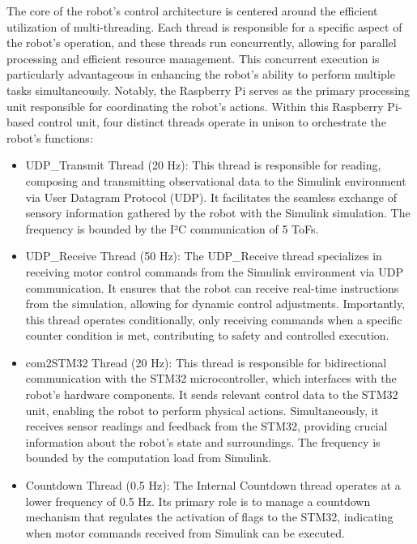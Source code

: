 The core of the robot's control architecture is centered around the efficient utilization of multi-threading. Each thread is responsible for a specific aspect of the robot's operation, and these threads run concurrently, allowing for parallel processing and efficient resource management. This concurrent execution is particularly advantageous in enhancing the robot's ability to perform multiple tasks simultaneously. Notably, the Raspberry Pi serves as the primary processing unit responsible for coordinating the robot's actions. Within this Raspberry Pi-based control unit, four distinct threads operate in unison to orchestrate the robot's functions: 
\begin{itemize}
    \item UDP\_Transmit Thread (20 Hz): This thread is responsible for reading, composing and transmitting observational data to the Simulink environment via User Datagram Protocol (UDP). It facilitates the seamless exchange of sensory information gathered by the robot with the Simulink simulation. The frequency is bounded by the I²C communication of 5 ToFs. 
    \item UDP\_Receive Thread (50 Hz): The UDP\_Receive thread specializes in receiving motor control commands from the Simulink environment via UDP communication. It ensures that the robot can receive real-time instructions from the simulation, allowing for dynamic control adjustments. Importantly, this thread operates conditionally, only receiving commands when a specific counter condition is met, contributing to safety and controlled execution.
    \item com2STM32 Thread (20 Hz): This thread is responsible for bidirectional communication with the STM32 microcontroller, which interfaces with the robot's hardware components. It sends relevant control data to the STM32 unit, enabling the robot to perform physical actions. Simultaneously, it receives sensor readings and feedback from the STM32, providing crucial information about the robot's state and surroundings. The frequency is bounded by the computation load from Simulink. 
    \item Countdown Thread (0.5 Hz): The Internal Countdown thread operates at a lower frequency of 0.5 Hz. Its primary role is to manage a countdown mechanism that regulates the activation of flags to the STM32, indicating when motor commands received from Simulink can be executed.
\end{itemize}

